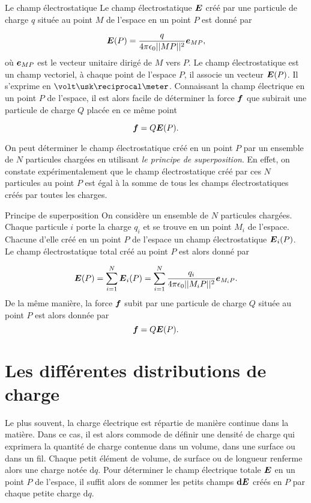 \begin{defn}{Le champ électrostatique}
	Le champ électrostatique $\vece$ créé par une particule de charge $q$
	située au point $M$ de l'espace en un point $P$ est donné par

	\begin{equation}
		\vece(P) = \dfrac{q}{4 \pi \epsilon_0 ||MP||^2}\mitbf{e}_{MP},
	\end{equation}
	où $\mitbf{e}_{MP}$ est le vecteur unitaire dirigé de $M$ vers $P$.
	Le champ électrostatique est un champ vectoriel, à chaque point 
	de l'espace $P$, il associe un vecteur $\vece(P)$.
	Il s'exprime en $\volt \usk \reciprocal \meter$. 
	Connaissant la champ électrique en un point $P$ de l'espace, il est alors
	facile de déterminer la force $\vecf$ que subirait une particule de charge
	$Q$ placée en ce même point

	\begin{equation}
		\vecf = Q\vece(P).
	\end{equation}
\end{defn}

On peut déterminer le champ électrostatique 
créé en un point $P$ par un ensemble de $N$ particules chargées en utilisant
\emph{le principe de superposition}.
En effet, on constate expérimentalement que le champ électrostatique créé par ces
$N$ particules au point $P$ est égal à la somme de tous les champs
électrostatiques créés par toutes les charges.

\begin{defn}{Principe de superposition}
	On considère un ensemble de $N$ particules chargées. Chaque particule $i$
	porte la charge $q_i$ et se trouve en un point $M_i$ de l'espace. Chacune
	d'elle créé en un point $P$ de l'espace un champ électrostatique $\vece_i(P)$.
	Le champ électrostatique total créé au point $P$ est alors donné par 

	\begin{equation}
		\vece(P) = \sum_{i=1}^{N} \vece_i(P)
			 =  \sum_{i=1}^{N} \dfrac{q_i}{4 \pi \epsilon_0 ||M_i P||^2}
			   \mitbf{e}_{M_i P}.
		\label{eq:superposition}
	\end{equation}
	De la même manière, la force $\vecf$ subit par une particule de charge $Q$ 
	située au point $P$ est alors donnée par
	\begin{equation}
		\vecf = Q \vece(P).
	\end{equation}
\end{defn}

\section{Les différentes distributions de charge}
Le plus souvent, la charge électrique est répartie de manière continue dans la 
matière. Dans ce cas, il est alors commode de définir une densité de charge qui
exprimera la quantité de charge contenue dans un volume, dans
une surface ou dans un fil. Chaque petit élément de volume, de surface ou de 
longueur renferme alors une charge notée $\mathrm{d}q$. Pour déterminer le 
champ électrique totale $\vece$ en un point $P$ de l'espace, 
il suffit alors de sommer les petits champs $\mathrm{\textbf{d}}\vece$ créés en $P$ 
par chaque petite charge $\mathrm{d}q$.

